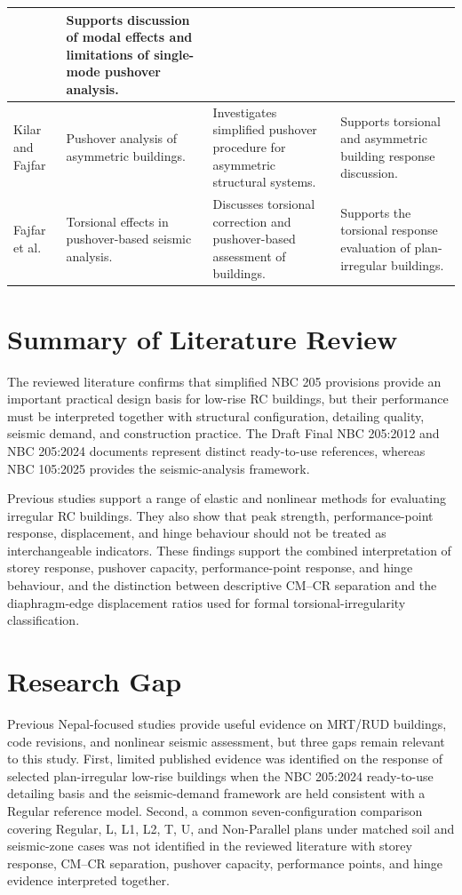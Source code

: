 \begin{longtable}{@{}p{3.25cm}p{3.30cm}p{3.35cm}p{2.90cm}@{}}
& Supports discussion of modal effects and limitations of single-mode pushover analysis. \\ \hline
Kilar and Fajfar\newline \cite{kilar1997asymmetric}
& Pushover analysis of asymmetric buildings.
& Investigates simplified pushover procedure for asymmetric structural systems.
& Supports torsional and asymmetric building response discussion. \\ \hline
Fajfar et al.\newline \cite{fajfar2005torsional}
& Torsional effects in pushover-based seismic analysis.
& Discusses torsional correction and pushover-based assessment of buildings.
& Supports the torsional response evaluation of plan-irregular buildings. \\ \hline\hline
\end{longtable}
\endgroup


\section{Summary of Literature Review}
The reviewed literature confirms that simplified NBC 205 provisions provide an important practical design basis for low-rise RC buildings, but their performance must be interpreted together with structural configuration, detailing quality, seismic demand, and construction practice. The Draft Final NBC 205:2012 and NBC 205:2024 documents represent distinct ready-to-use references, whereas NBC 105:2025 provides the seismic-analysis framework.

Previous studies support a range of elastic and nonlinear methods for evaluating irregular RC buildings. They also show that peak strength, performance-point response, displacement, and hinge behaviour should not be treated as interchangeable indicators. These findings support the combined interpretation of storey response, pushover capacity, performance-point response, and hinge behaviour, and the distinction between descriptive CM--CR separation and the diaphragm-edge displacement ratios used for formal torsional-irregularity classification.

\section{Research Gap}
Previous Nepal-focused studies provide useful evidence on MRT/RUD buildings, code revisions, and nonlinear seismic assessment, but three gaps remain relevant to this study. First, limited published evidence was identified on the response of selected plan-irregular low-rise buildings when the NBC 205:2024 ready-to-use detailing basis and the seismic-demand framework are held consistent with a Regular reference model. Second, a common seven-configuration comparison covering Regular, L, L1, L2, T, U, and Non-Parallel plans under matched soil and seismic-zone cases was not identified in the reviewed literature with storey response, CM--CR separation, pushover capacity, performance points, and hinge evidence interpreted together.


